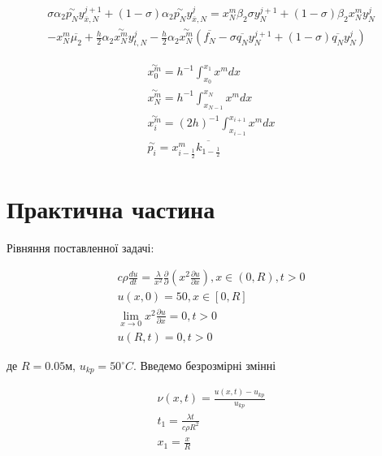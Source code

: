 \documentclass[14pt,a4paper]{scrartcl}
\begin{document}
\begin{multline} \label{eq9}
	\sigma \alpha_{2} \overset{\sim}{p_N} y^{j+1}_{\overline{x},N} + (1-\sigma)\alpha_{2} \overset{\sim}{p_N} y^{j}_{\overline{x},N} = x_{N}^{m} \beta_{2} \sigma y^{j+1}_{N}  + (1-\sigma) \beta_{2} x_{N}^{m} y_{N}^{j} \\- x_{N}^{m}\overline{\mu_{2}} + \frac{h}{2}\alpha_{2}\overset{\sim}{x^{m}_N} y_{t,N}^{j} - \frac{h}{2} \alpha_{2} \overset{\sim}{x^{m}_N} (\overline{f_N} -\sigma \overline{q_N}y_{N}^{j+1} + (1-\sigma)\overline{q_N} y^{j}_N )
\end{multline}

\begin{gather}
	\overset{\sim}{x^{m}_{0}} = h^{-1} \int_{x_0}^{x_1} x^m dx \label{eq10}\\
	\overset{\sim}{x^{m}_{N}} = h^{-1} \int_{x_{N-1}}^{x_N} x^m dx \label{eq11}\\
	\overset{\sim}{x^{m}_{i}} = (2h)^{-1} \int_{x_{i-1}}^{x_{i+1}} x^m dx \label{eq12}\\
	\overset{\sim}{p_i} = x^{m}_{i-\frac{1}{2}} \overline{k_{1-\frac{1}{2}}} \label{eq13}
\end{gather}

\newpage

\section{Практична частина}

Рівняння поставленної задачі:

\begin{gather}
	c\rho \frac{du}{dt} = \frac{\lambda}{x^2} \frac{\partial}{\partial}\left( x^2 \frac{\partial u}{\partial x}\right), x \in (0,R), t>0 \label{eq14} \\
	u(x,0) = 50, x\in [0,R] \label{eq15}\\
	\lim_{x \to 0} x^{2}\frac{\partial u}{\partial x} = 0, t>0\label{eq16} \\
	u(R, t) = 0 , t>0 \label{eq17}	
\end{gather}

де $R = 0.05 \text{м}$, $u_{kp} = 50^\circ C$. Введемо безрозмірні змінні

\begin{gather}
	\nu(x,t) = \frac{u(x,t) - u_{kp}}{u_{kp}} \label{eq18}\\
	t_1 = \frac{\lambda t}{c \rho R^2} \label{eq19}\\
	x_1 = \frac{x}{R} \label{eq20}
\end{gather}
\end{document}
